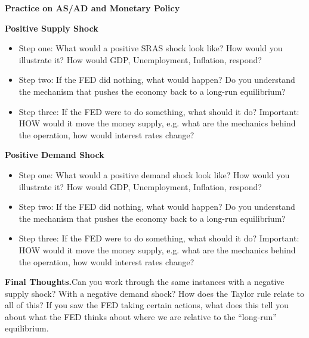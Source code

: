 \documentclass[12pt,pdftex,twoside,letterpaper]{exam}
\begin{document}
\centerline{}
\smallskip
\centerline{\Large \bf Practice on AS/AD and Monetary Policy}

\centerline{\bf Positive Supply Shock}
\begin{itemize}
\item Step one: What would a positive SRAS shock look like? How would you illustrate it? How would GDP, Unemployment, Inflation, respond?
\bigskip
\bigskip
\item Step two: If the FED did nothing, what would happen? Do you understand the mechanism that pushes the economy back to a long-run equilibrium?
\bigskip
\bigskip
\item Step three: If the FED were to do something, what should it do? Important: HOW would it move the money supply, e.g. what are the mechanics behind the operation, how would interest rates change?
\end{itemize}
\centerline{\bf Positive Demand Shock}
\begin{itemize}
\item Step one: What would a positive demand shock look like? How would you illustrate it? How would GDP, Unemployment, Inflation, respond? 
\bigskip
\bigskip
\item Step two: If the FED did nothing, what would happen? Do you understand the mechanism that pushes the economy back to a long-run equilibrium?
\bigskip
\bigskip
\item Step three: If the FED were to do something, what should it do? Important: HOW would it move the money supply, e.g. what are the mechanics behind the operation, how would interest rates change?
\end{itemize}
\bigskip
\bigskip
\textbf{Final Thoughts.}Can you work through the same instances with a negative supply shock? With a negative demand shock? How does the Taylor rule relate to all of this? If you saw the FED taking certain actions, what does this tell you about what the FED thinks about where we are relative to the ``long-run'' equilibrium.
\end{document}
